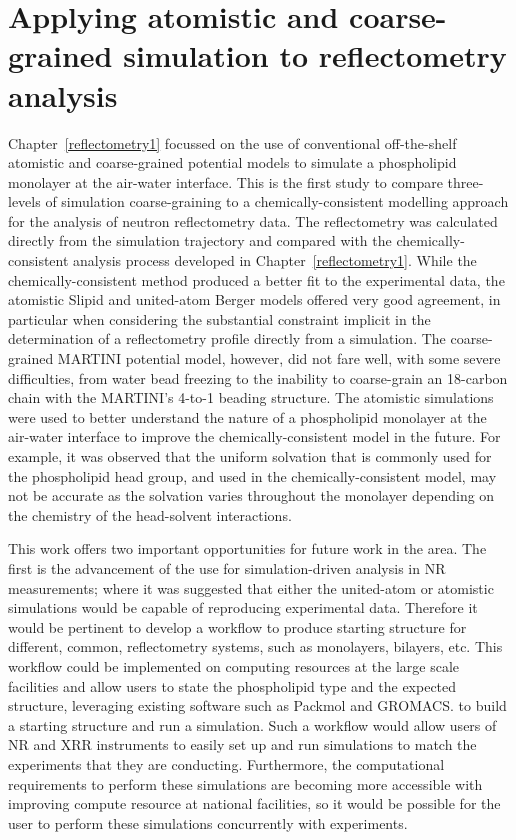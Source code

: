 \section{Applying atomistic and coarse-grained simulation to reflectometry analysis}
Chapter~\ref{reflectometry1} focussed on the use of conventional off-the-shelf atomistic and coarse-grained potential models to simulate a phospholipid monolayer at the air-water interface.
This is the first study to compare three-levels of simulation coarse-graining to a chemically-consistent modelling approach for the analysis of neutron reflectometry data.
The reflectometry was calculated directly from the simulation trajectory and compared with the chemically-consistent analysis process developed in Chapter~\ref{reflectometry1}.
While the chemically-consistent method produced a better fit to the experimental data, the atomistic Slipid and united-atom Berger models offered very good agreement, in particular when considering the substantial constraint implicit in the determination of a reflectometry profile directly from a simulation.
The coarse-grained MARTINI potential model, however, did not fare well, with some severe difficulties, from water bead freezing to the inability to coarse-grain an 18-carbon chain with the MARTINI's 4-to-1 beading structure.
The atomistic simulations were used to better understand the nature of a phospholipid monolayer at the air-water interface to improve the chemically-consistent model in the future.
For example, it was observed that the uniform solvation that is commonly used for the phospholipid head group, and used in the chemically-consistent model, may not be accurate as the solvation varies throughout the monolayer depending on the chemistry of the head-solvent interactions.

This work offers two important opportunities for future work in the area.
The first is the advancement of the use for simulation-driven analysis in NR measurements; where it was suggested that either the united-atom or atomistic simulations would be capable of reproducing experimental data.
Therefore it would be pertinent to develop a workflow to produce starting structure for different, common, reflectometry systems, such as monolayers, bilayers, etc.
This workflow could be implemented on computing resources at the large scale facilities and allow users to state the phospholipid type and the expected structure, leveraging existing software such as Packmol and GROMACS.\autocite[in a similar fashion the building of a monolayer in this work]{martinez_packmol_2009,lindahl_gromacs_2001} to build a starting structure and run a simulation.
Such a workflow would allow users of NR and XRR instruments to easily set up and run simulations to match the experiments that they are conducting.
Furthermore, the computational requirements to perform these simulations are becoming more accessible with improving compute resource at national facilities, so it would be possible for the user to perform these simulations concurrently with experiments.

